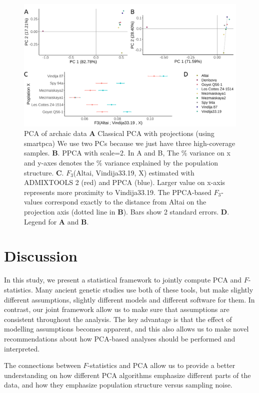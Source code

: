 \documentclass[12pt, letterpaper]{article}
\begin{document}
\begin{figure}[ht!]
    \includegraphics[width=16.5cm]{plots/nea_main.png}
    \centering
    \caption{PCA of archaic data \textbf{A} Classical PCA with projections (using smartpca) We use  two PCs because we just have three high-coverage samples.
    \textbf{B}. PPCA with scale=2. In A and B, The $\%$ variance on x and y-axes denotes the $\%$ variance explained by the population structure. \textbf{C}. $F_3$(Altai, Vindija33.19, X) estimated with ADMIXTOOLS 2 (red) and PPCA (blue). Larger value on x-axis represents more proximity to Vindija33.19. The PPCA-based $F_3$-values correspond exactly to the distance from Altai on the projection axis (dotted line in \textbf{B}). Bars show 2 standard errors.
    \textbf{D}. Legend for \textbf{A} and \textbf{B}.
    }
    \label{fig:nea_f3}
\end{figure}


\section{Discussion}
In this study, we present a statistical framework to jointly compute PCA and $F$-statistics. Many ancient genetic studies use both of these tools, but make slightly different assumptions, slightly different models and different software for them. In contrast, our joint framework allow us to make sure that assumptions are consistent throughout the analysis. The key advantage is that the effect of modelling assumptions becomes apparent, and this also allows us to make novel recommendations about how PCA-based analyses should be performed and interpreted.

The connections between $F$-statistics and PCA allow us to provide a better understanding on how different PCA algorithms emphasize different parts of the data, and how they emphasize population structure versus sampling noise.
\end{document}
